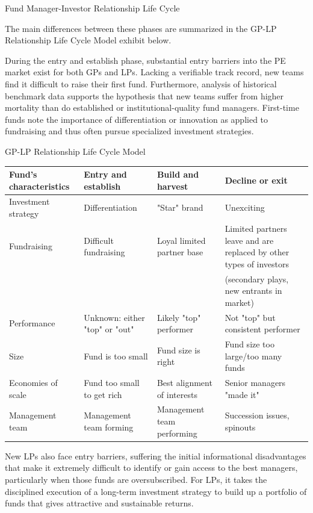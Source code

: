 \documentclass[11pt]{article}
\begin{document}
Fund Manager-Investor Relationship Life Cycle

The main differences between these phases are summarized in the GP-LP Relationship Life Cycle Model exhibit below.

During the entry and establish phase, substantial entry barriers into the PE market exist for both GPs and LPs. Lacking a verifiable track record, new teams find it difficult to raise their first fund. Furthermore, analysis of historical benchmark data supports the hypothesis that new teams suffer from higher mortality than do established or institutional-quality fund managers. First-time funds note the importance of differentiation or innovation as applied to fundraising and thus often pursue specialized investment strategies.

GP-LP Relationship Life Cycle Model

\begin{center}
\begin{tabular}{|llll|}
\hline
Fund's characteristics & Entry and establish & Build and harvest & Decline or exit \\
\hline
Investment strategy & Differentiation & "Star" brand & Unexciting \\
Fundraising & Difficult fundraising & Loyal limited partner base & Limited partners leave and are replaced by other types of investors \\
 &  &  & (secondary plays, new entrants in market) \\
Performance & Unknown: either "top" or "out" & Likely "top" performer & Not "top" but consistent performer \\
Size & Fund is too small & Fund size is right & Fund size too large/too many funds \\
Economies of scale & Fund too small to get rich & Best alignment of interests & Senior managers "made it" \\
Management team & Management team forming & Management team performing & Succession issues, spinouts \\
\hline
\end{tabular}
\end{center}

New LPs also face entry barriers, suffering the initial informational disadvantages that make it extremely difficult to identify or gain access to the best managers, particularly when those funds are oversubscribed. For LPs, it takes the disciplined execution of a long-term investment strategy to build up a portfolio of funds that gives attractive and sustainable returns.
\end{document}
